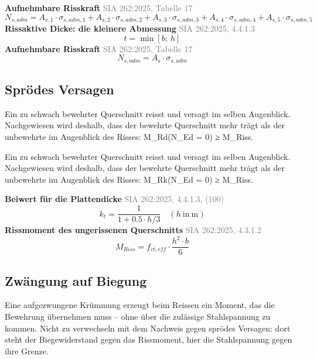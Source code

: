 \documentclass[11pt,a4paper]{article}
\newcommand{\normref}[1]{{\small\textcolor{gray}{#1}}}
\begin{document}
\noindent\textbf{Aufnehmbare Risskraft} \hfill \normref{SIA 262:2025, Tabelle 17}
\begin{equation*}
N_{s,adm} = A_{s,1} \cdot \sigma_{s,adm,1} + A_{s,2} \cdot \sigma_{s,adm,2} + A_{s,3} \cdot \sigma_{s,adm,3} + A_{s,4} \cdot \sigma_{s,adm,4} + A_{s,5} \cdot \sigma_{s,adm,5}
\end{equation*}
\noindent\textbf{Rissaktive Dicke: die kleinere Abmessung} \hfill \normref{SIA 262:2025, 4.4.1.3}
\begin{equation*}
t = \min\left[b;\ h\right]
\end{equation*}
\noindent\textbf{Aufnehmbare Risskraft} \hfill \normref{SIA 262:2025, Tabelle 17}
\begin{equation*}
N_{s,adm} = A_s \cdot \sigma_{s,adm}
\end{equation*}
\subsection{Sprödes Versagen}
Ein zu schwach bewehrter Querschnitt reisst und versagt im selben Augenblick. Nachgewiesen wird deshalb, dass der bewehrte Querschnitt mehr trägt als der unbewehrte im Augenblick des Risses: M\_Rd(N\_Ed = 0) ≥ M\_Riss.

Ein zu schwach bewehrter Querschnitt reisst und versagt im selben Augenblick. Nachgewiesen wird deshalb, dass der bewehrte Querschnitt mehr trägt als der unbewehrte im Augenblick des Risses: M\_Rk(N\_Ed = 0) ≥ M\_Riss.

\noindent\textbf{Beiwert für die Plattendicke} \hfill \normref{SIA 262:2025, 4.4.1.3, (100)}
\begin{equation*}
k_t = \frac{1}{1 + 0.5 \cdot h/3} \quad \left(h\ \text{in}\ \mathrm{m}\right)
\end{equation*}
\noindent\textbf{Rissmoment des ungerissenen Querschnitts} \hfill \normref{SIA 262:2025, 4.3.1.2}
\begin{equation*}
M_{Riss} = f_{ct,eff} \cdot \frac{h^{2} \cdot b}{6}
\end{equation*}
\subsection{Zwängung auf Biegung}
Eine aufgezwungene Krümmung erzeugt beim Reissen ein Moment, das die Bewehrung übernehmen muss – ohne über die zulässige Stahlspannung zu kommen. Nicht zu verwechseln mit dem Nachweis gegen sprödes Versagen: dort steht der Biegewiderstand gegen das Rissmoment, hier die Stahlspannung gegen ihre Grenze.
\end{document}
